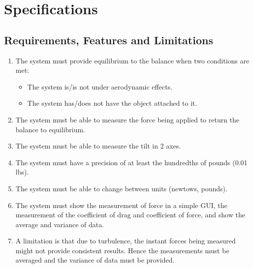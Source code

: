 \section{Specifications}
	\subsection{Requirements, Features and Limitations}
		\begin{enumerate}
			\item The system must provide equilibrium to the balance when two conditions are met:
			
			\begin{itemize}
				\item The system is/is not under aerodynamic effects.
				\item The system has/does not have the object attached to it.
			\end{itemize}
			
			\item The system must be able to measure the force being applied to return the balance
			to equilibrium.

			\item The system must be able to measure the tilt in 2 axes.

			\item The system must have a precision of at least the hundredths of pounds (0.01 lbs).

			\item The system must be able to change between units (newtows, pounds).

			\item The system must show the measurement of force in a simple GUI, the measurement of the coefficient of drag and coefficient of force, and show the average and variance of data.

			\item A limitation is that due to turbulence, the instant forces being measured might not provide consistent results. Hence the measurements must be averaged and the variance of data must be provided.
		\end{enumerate}


